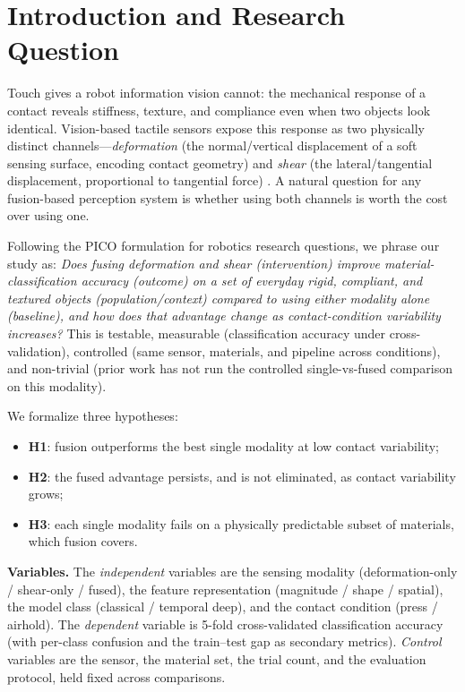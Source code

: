 \documentclass[conference]{IEEEtran}
\begin{document}
\section{Introduction and Research Question}
Touch gives a robot information vision cannot: the mechanical response of a
contact reveals stiffness, texture, and compliance even when two objects look
identical. Vision-based tactile sensors expose this response as two physically
distinct channels---\emph{deformation} (the normal/vertical displacement of a
soft sensing surface, encoding contact geometry) and \emph{shear} (the
lateral/tangential displacement, proportional to tangential force)
\cite{gelsight}. A natural question for any fusion-based perception system is
whether using both channels is worth the cost over using one.

Following the PICO formulation for robotics research questions, we phrase our
study as: \emph{Does fusing deformation and shear (intervention) improve
material-classification accuracy (outcome) on a set of everyday rigid, compliant,
and textured objects (population/context) compared to using either modality
alone (baseline), and how does that advantage change as contact-condition
variability increases?} This is testable, measurable (classification accuracy
under cross-validation), controlled (same sensor, materials, and pipeline across
conditions), and non-trivial (prior work has not run the controlled
single-vs-fused comparison on this modality).

We formalize three hypotheses:
\begin{itemize}
\item \textbf{H1}: fusion outperforms the best single modality at low contact
variability;
\item \textbf{H2}: the fused advantage persists, and is not eliminated, as
contact variability grows;
\item \textbf{H3}: each single modality fails on a physically predictable subset
of materials, which fusion covers.
\end{itemize}

\noindent\textbf{Variables.} The \emph{independent} variables are the sensing
modality (deformation-only / shear-only / fused), the feature representation
(magnitude / shape / spatial), the model class (classical / temporal deep), and
the contact condition (press / airhold). The \emph{dependent} variable is
5-fold cross-validated classification accuracy (with per-class confusion and the
train--test gap as secondary metrics). \emph{Control} variables are the sensor,
the material set, the trial count, and the evaluation protocol, held fixed
across comparisons.
\end{document}
